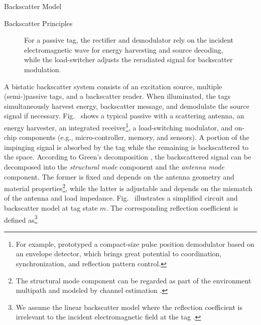 \documentclass[journal]{IEEEtran}
\begin{document}
\begin{section}{Backscatter Model}
\begin{subsection}{Backscatter Principles}
\begin{figure}[!t]
{{					}
					\label{fi:block_diagram_of_a_passive_tag}
				}
				\caption{For a passive tag, the rectifier and demodulator rely on the incident electromagnetic wave for energy harvesting and source decoding, while the load-switcher adjusts the reradiated signal for backscatter modulation.}
				\label{fi:tag}
			\end{figure}
			A bistatic backscatter system consists of an excitation source, multiple (semi-)passive tags, and a backscatter reader. When illuminated, the tags simultaneously harvest energy, backscatter message, and demodulate the source signal if necessary. Fig.~ shows a typical passive with a scattering antenna, an energy harvester, an integrated receiver\footnote{For example, \cite{Kim2021a} prototyped a compact-size pulse position demodulator based on an envelope detector, which brings great potential to coordination, synchronization, and reflection pattern control.}, a load-switching modulator, and on-chip components (e.g., micro-controller, memory, and sensors). A portion of the impinging signal is absorbed by the tag while the remaining is backscattered to the space. According to Green's decomposition \cite{Hansen1989}, the backscattered signal can be decomposed into the \emph{structural mode} component and the \emph{antenna mode} component. The former is fixed and depends on the antenna geometry and material properties\footnote{The structural mode component can be regarded as part of the environment multipath and modeled by channel estimation \cite{Boyer2014}.}, while the latter is adjustable and depends on the mismatch of the antenna and load impedance. Fig.~ illustrates a simplified circuit and backscatter model at tag state $m$. The corresponding reflection coefficient is defined as\footnote{We assume the linear backscatter model where the reflection coefficient is irrelevant to the incident electromagnetic field at the tag \cite{Dobkin2012}.}

\end{subsection}
\end{section}
\end{document}

